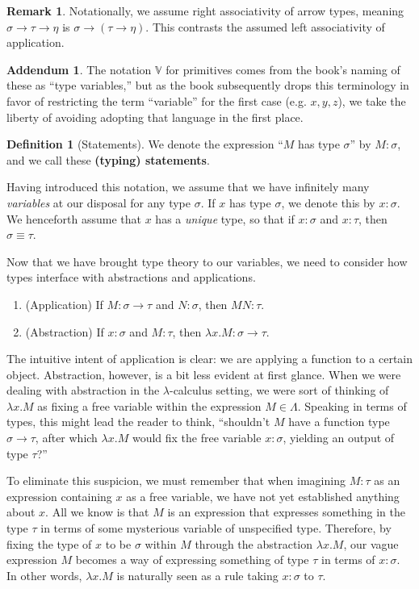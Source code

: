 \documentclass{article}
\theoremstyle{definition}
\newtheorem{definition} [theorem] {Definition}
\newtheorem{remark} [theorem] {Remark}
\newtheorem{addendum}{Addendum}
\newcommand{\1}{\mathbb{1}}
\newcommand{\0}{\mathbb{0}}
\newcommand{\bb}{\mathbb}
\begin{document}
\begin{remark}
    Notationally, we assume right associativity of arrow types, meaning $\sigma \to \tau \to \eta$ is $\sigma \to (\tau \to \eta)$. This contrasts the assumed left associativity of application. 
\end{remark}

\begin{addendum}
    The notation $\bb V$ for primitives comes from the book's naming of these as \enquote{type variables,} but as the book subsequently drops this terminology in favor of restricting the term \enquote{variable} for the first case (e.g. $x,y,z$), we take the liberty of avoiding adopting that language in the first place.
\end{addendum}

\begin{definition}[Statements]
    We denote the expression \enquote{$M$ has type $\sigma$} by $M:\sigma$, and we call these \textbf{(typing) statements}.
\end{definition}

Having introduced this notation, we assume that we have infinitely many \textit{variables} at our disposal for any type $\sigma$. If $x$ has type $\sigma$, we denote this by $x : \sigma$. We henceforth assume that $x$ has a \textit{unique} type, so that if $x : \sigma$ and $x : \tau$, then $\sigma \equiv \tau$. 

Now that we have brought type theory to our variables, we need to consider how types interface with abstractions and applications. 
\begin{enumerate}
    \item (Application) If $M : \sigma \to \tau$ and $N : \sigma$, then $MN : \tau$. 
    \item (Abstraction) If $x : \sigma$ and $M : \tau$, then $\lambda x. M : \sigma \to \tau$. 
\end{enumerate}
The intuitive intent of application is clear: we are applying a function to a certain object. Abstraction, however, is a bit less evident at first glance. When we were dealing with abstraction in the $\lambda$-calculus setting, we were sort of thinking of $\lambda x. M$ as fixing a free variable within the expression $M \in \Lambda$. Speaking in terms of types, this might lead the reader to think, \enquote{shouldn't $M$ have a function type $\sigma \to \tau$, after which $\lambda x. M$ would fix the free variable $x : \sigma$, yielding an output of type $\tau$?} 

To eliminate this suspicion, we must remember that when imagining $M : \tau$ as an expression containing $x$ as a free variable, we have not yet established anything about $x$. All we know is that $M$ is an expression that expresses something in the type $\tau$ in terms of some mysterious variable of unspecified type. Therefore, by fixing the type of $x$ to be $\sigma$ within $M$ through the abstraction $\lambda x. M$, our vague expression $M$ becomes a way of expressing something of type $\tau$ in terms of $x : \sigma$. In other words, $\lambda x. M$ is naturally seen as a rule taking $x : \sigma$ to $\tau$.
\end{document}
